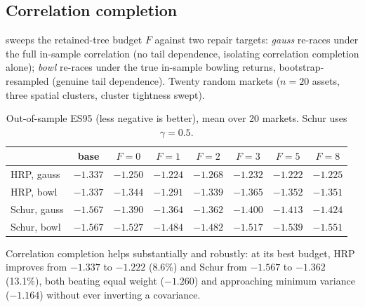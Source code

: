 \documentclass[11pt]{article}
\begin{document}
\subsection{Correlation completion}
\label{sec:main-result}

 sweeps the retained-tree budget $F$ against two repair
targets: \emph{gauss} re-races under the full in-sample correlation (no
tail dependence, isolating correlation completion alone); \emph{bowl}
re-races under the true in-sample bowling returns, bootstrap-resampled
(genuine tail dependence). Twenty random markets ($n=20$ assets, three
spatial clusters, cluster tightness swept).

\begin{table}[h]
\centering
\caption{Out-of-sample ES95 (less negative is better), mean over 20 markets.
Schur uses $\gamma=0.5$.}
\label{tab:main}
\footnotesize
\begin{tabular}{lccccccc}
\toprule
 & base & $F=0$ & $F=1$ & $F=2$ & $F=3$ & $F=5$ & $F=8$ \\
\midrule
HRP, gauss     & $-1.337$ & $-1.250$ & $-1.224$ & $-1.268$ & $-1.232$ & $\mathbf{-1.222}$ & $-1.225$ \\
HRP, bowl      & $-1.337$ & $-1.344$ & $\mathbf{-1.291}$ & $-1.339$ & $-1.365$ & $-1.352$ & $-1.351$ \\
Schur, gauss   & $-1.567$ & $-1.390$ & $-1.364$ & $\mathbf{-1.362}$ & $-1.400$ & $-1.413$ & $-1.424$ \\
Schur, bowl    & $-1.567$ & $-1.527$ & $-1.484$ & $\mathbf{-1.482}$ & $-1.517$ & $-1.539$ & $-1.551$ \\
\bottomrule
\end{tabular}
\end{table}

Correlation completion helps substantially and robustly: at its best budget,
HRP improves from $-1.337$ to $-1.222$ (8.6\%) and Schur from $-1.567$ to
$-1.362$ (13.1\%), both beating equal weight ($-1.260$) and approaching
minimum variance ($-1.164$) without ever inverting a covariance.
\end{document}

